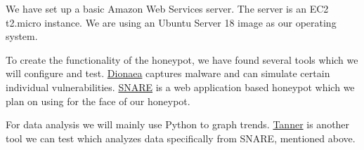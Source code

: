 We have set up a basic Amazon Web Services server. The server is an EC2 t2.micro instance. We are using an Ubuntu Server 18 image as our operating system. 

To create the functionality of the honeypot, we have found several tools which we will configure and test. \href{https://github.com/DinoTools/dionaea}{Dionaea} captures malware and can simulate certain individual vulnerabilities. \href{https://github.com/mushorg/snare}{SNARE} is a web application based honeypot which we plan on using for the face of our honeypot. 

For data analysis we will mainly use Python to graph trends. \href{https://github.com/mushorg/tanner/}{Tanner} is another tool we can test which analyzes data specifically from SNARE, mentioned above. 
